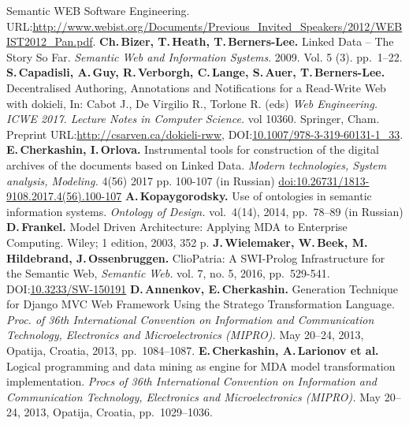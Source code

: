 \documentclass[runningheads]{llncs}
\begin{document}
\begin{thebibliography}{11}
 Semantic WEB Software Engineering. URL:\url{http://www.webist.org/Documents/Previous\_Invited\_Speakers/2012/WEBIST2012\_Pan.pdf}. %
 \textbf{Ch.\,Bizer, T.\,Heath, T.\,Berners-Lee.} Linked Data -- The Story So Far. \emph{Semantic Web and Information Systems}. 2009. Vol. 5 (3). pp.~1--22.
 \textbf{S.\,Capadisli, A.\,Guy, R.\,Verborgh, C.\,Lange, S.\,Auer, T.\,Berners-Lee.} Decentralised Authoring, Annotations and Notifications for a Read-Write Web with dokieli, In: Cabot J., De Virgilio R., Torlone R. (eds) \emph{Web Engineering. ICWE 2017. Lecture Notes in Computer Science.} vol 10360. Springer, Cham. Preprint URL:\url{http://csarven.ca/dokieli-rww}, DOI:\url{10.1007/978-3-319-60131-1_33}.
 \textbf{E.\,Cherkashin, I.\,Orlova.} Instrumental tools for construction of the digital archives of the documents based on Linked Data. \emph{Modern technologies, System analysis, Modeling.} 4(56) 2017 pp. 100-107 (in Russian) \href{http://stsam.irgups.ru/sites/default/files/articles\_pdf\_files/100-107.pdf}{doi:10.26731/1813-9108.2017.4(56).100-107}
 \textbf{A.\,Kopaygorodsky.} Use of ontologies in semantic information systems. \emph{Ontology of Design.} vol.~4(14), 2014, pp.~78--89 (in Russian) %
 \textbf{D.\,Frankel.} Model Driven Architecture: Applying MDA to Enterprise Computing. Wiley; 1 edition, 2003, 352 p.
 \textbf{J.\,Wielemaker, W.\,Beek, M.\,Hildebrand, J.\,Ossenbruggen.} ClioPatria: A SWI-Prolog Infrastructure for the Semantic Web, \emph{Semantic Web.} vol. 7, no. 5, 2016, pp.~529-541. DOI:\url{10.3233/SW-150191}
 \textbf{D.\,Annenkov, E.\,Cherkashin.} Generation Technique for Django MVC Web Framework Using the Stratego Transformation Language. \emph{Proc. of 36th International Convention on Information and Communication Technology, Electronics and Microelectronics (MIPRO).} May 20--24, 2013, Opatija, Croatia, 2013, pp.~1084--1087.
 \textbf{E.\,Cherkashin, A.\,Larionov et al.} Logical programming and data mining as engine for MDA model transformation implementation. \emph{Procs of 36th International Convention on Information and Communication Technology, Electronics and Microelectronics (MIPRO).} May 20--24, 2013, Opatija, Croatia, pp.~1029--1036.

\end{thebibliography}
\end{document}
